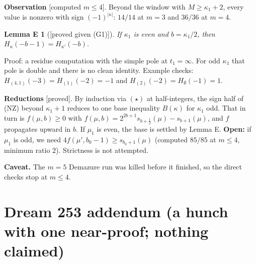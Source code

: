 \documentclass[10pt]{amsart}
\newcommand{\grade}[1]{\textsf{[#1]}}
\newtheorem*{lemE}{Lemma E}
\begin{document}
\textbf{Observation} \grade{computed $m\le4$}. Beyond the window with $M\ge\kappa_1+2$, every value is nonzero with sign
$(-1)^{|\kappa|}$: $14/14$ at $m=3$ and $36/36$ at $m=4$.

\begin{lemE}[\grade{proved given (G1)}]
If $\kappa_1$ is even and $b=\kappa_1/2$, then $H_\kappa(-b-1)=H_{\kappa'}(-b)$.
\end{lemE}
Proof: a residue computation with the simple pole at $t_1=\infty$. For odd $\kappa_1$ that pole is double and there is no
clean identity. Example checks: $H_{(4,1)}(-3)=H_{(1)}(-2)=-1$ and $H_{(2)}(-2)=H_\emptyset(-1)=1$.

\textbf{Reductions} \grade{proved}. By induction via $(\star)$ at half-integers, the sign half of (NZ) beyond $\kappa_1+1$
reduces to one base inequality $B(\kappa)$ for $\kappa_1$ odd. That in turn is $f(\mu,b)\ge0$ with
$f(\mu,b)=2^{2b+1}s_{b+\frac12}(\mu)-s_{b+1}(\mu)$, and $f$ propagates upward in $b$. If $\mu_1$ is even, the base is settled by
Lemma E. \textbf{Open:} if $\mu_1$ is odd, we need $4f(\mu',b_0-1)\ge s_{b_0+1}(\mu)$ (computed $85/85$ at $m\le4$, minimum
ratio $2$). Strictness is not attempted.

\textbf{Caveat.} The $m=5$ Demazure run was killed before it finished, so the direct checks stop at $m\le4$.

\section{Dream 253 addendum (a hunch with one near-proof; nothing claimed)}
\end{document}
